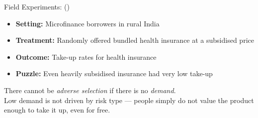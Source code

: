 \documentclass[aspectratio=169, 11pt]{beamer}
\begin{document}
\begin{frame}[t]{Field Experiments: \citeauthor{Banerjee2014_health} (\citeyear{Banerjee2014_health})}
\begin{examplebox}
  \small
  \begin{itemize}
    \item \textbf{Setting:} Microfinance borrowers in rural India
    \item \textbf{Treatment:} Randomly offered bundled health insurance at a subsidised price
    \item \textbf{Outcome:} Take-up rates for health insurance
    \item \textbf{Puzzle:} Even heavily subsidised insurance had very low take-up
  \end{itemize}
\end{examplebox}
\vspace{0.4em}
\begin{keybox}
There cannot be \emph{adverse selection} if there is no \emph{demand}.\\[0.3em]
Low demand is not driven by risk type — people simply do not value the product
enough to take it up, even for free.
\end{keybox}
\end{frame}
\end{document}
